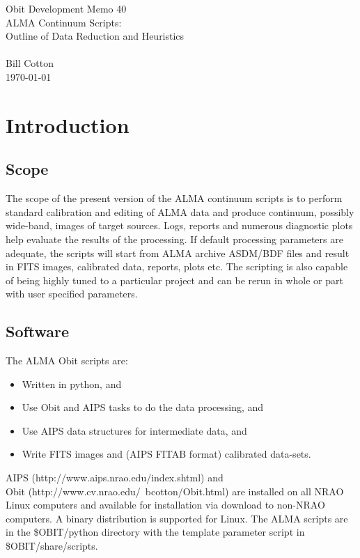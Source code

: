 \documentclass[11pt]{article}
\begin{document}
{
\begin{center}
{\Large Obit Development Memo 40\\ }
{\Large ALMA Continuum Scripts: \\
Outline of Data Reduction and Heuristics} \\
~ \\
Bill Cotton \\
\today
\end{center}}

\section{Introduction}



\subsection{Scope}

The scope of the present version of the ALMA continuum scripts is to
perform standard calibration and editing of ALMA data and produce
continuum, possibly wide-band, images of target sources.
Logs, reports and numerous diagnostic plots help evaluate the results
of the processing.
If default processing parameters are adequate, the scripts will start
from ALMA archive ASDM/BDF files and result in FITS images,
calibrated data, reports, plots etc.
The scripting is also capable of being highly tuned to a particular
project and can be rerun in whole or part with user specified
parameters.

\subsection{Software}

The ALMA Obit scripts are:

\begin{itemize}
\item Written in python, and
\item Use Obit and AIPS tasks to do the data processing, and
\item Use AIPS data structures for intermediate data, and
\item Write FITS images and (AIPS FITAB format) calibrated data-sets.
\end{itemize}

AIPS (http://www.aips.nrao.edu/index.shtml) and\\
Obit (http://www.cv.nrao.edu/~bcotton/Obit.html)
are installed on all NRAO Linux computers and available for 
installation via download to non-NRAO computers.
A binary distribution is supported for Linux.
The ALMA scripts are in the \$OBIT/python directory with the template
parameter script in \$OBIT/share/scripts.
\end{document}
